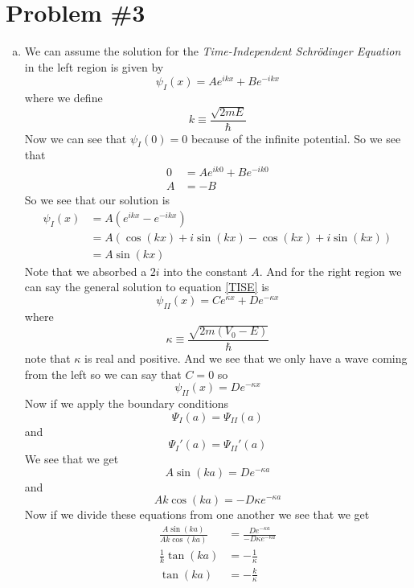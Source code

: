 \documentclass[11pt]{article}
\numberwithin{equation}{section}
\begin{document}
\section{Problem \#3}
\begin{enumerate}[(a)]
\item
We can assume the solution for the \emph{Time-Independent Schr\"{o}dinger Equation} in the left region is given by
$$\psi_I(x) = Ae^{ikx}+Be^{-ikx}$$
where we define 
$$k\equiv\frac{\sqrt{2mE}}{\hbar}$$
Now we can see that $\psi_I(0) = 0$ because of the infinite potential. So we see that
\begin{align*}
0 &= Ae^{ik0}+Be^{-ik0}\\
A &= -B
\end{align*}
So we see that our solution is 
\begin{align*}
\psi_I(x) &= A(e^{ikx}-e^{-ikx})\\
&= A(\cos(kx)+i\sin(kx)-\cos(kx)+i\sin(kx))\\
&= A\sin(kx)
\end{align*}
Note that we absorbed a $2i$ into the constant $A$. And for the right region we can say the general solution to equation \ref{TISE} is 
$$\psi_{II}(x) = Ce^{\kappa x}+De^{-\kappa x}$$ 
where 
$$\kappa\equiv\frac{\sqrt{2m(V_0-E)}}{\hbar}$$
note that $\kappa$ is real and positive. And we see that we only have a wave coming from the left so we can say that $C=0$ so 
$$\psi_{II}(x) = De^{-\kappa x}$$
Now if we apply the boundary conditions 
$$\Psi_I(a) = \Psi_{II}(a)$$
and
$$\Psi_I'(a) = \Psi_{II}'(a)$$
We see that we get
$$A\sin(ka) = De^{-\kappa a}$$
and 
$$Ak\cos(ka) = -D\kappa e^{-\kappa a}$$
Now if we divide these equations from one another we see that we get
\begin{align*}
\frac{A\sin(ka)}{Ak\cos(ka)} &= \frac{De^{-\kappa a}}{-D\kappa e^{-\kappa a}}\\
\frac{1}{k}\tan(ka) &= -\frac{1}{\kappa}\\
\tan(ka) &= -\frac{k}{\kappa}
\end{align*}


\end{enumerate}
\end{document}

